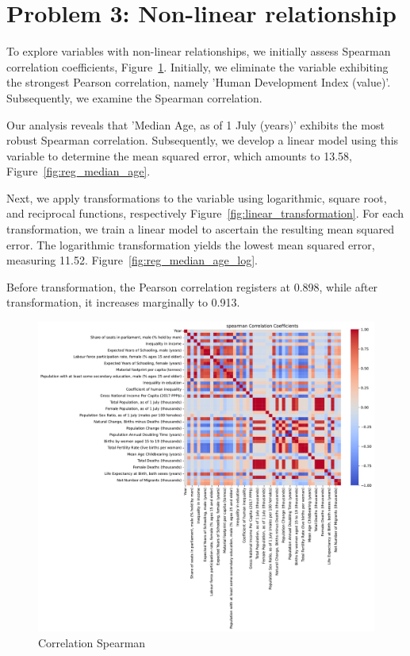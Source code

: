 \documentclass[a4paper]{article}
\begin{document}
\section*{Problem 3: Non-linear relationship}

To explore variables with non-linear relationships, we initially assess Spearman correlation coefficients, Figure~\ref{fig:spearman_correlation}. 
Initially, we eliminate the variable exhibiting the strongest Pearson correlation, namely 'Human Development Index (value)'. Subsequently, we examine the Spearman correlation.

Our analysis reveals that 'Median Age, as of 1 July (years)' exhibits the most robust Spearman correlation. Subsequently, 
we develop a linear model using this variable to determine the mean squared error, which amounts to 13.58, Figure~\ref{fig:reg_median_age}.

Next, we apply transformations to the variable using logarithmic, square root, and reciprocal functions, respectively  Figure~\ref{fig:linear_transformation}. 
For each transformation, we train a linear model to ascertain the resulting mean squared error. The logarithmic transformation yields the lowest mean squared error, measuring 11.52.  Figure~\ref{fig:reg_median_age_log}.

Before transformation, the Pearson correlation registers at 0.898, while after transformation, it increases marginally to 0.913.


\begin{figure}[H]
  \begin{center}
    \includegraphics[width=\textwidth]{ola/spearman_correlation.pdf}
    \caption{Correlation Spearman}
    \label{fig:spearman_correlation}
  \end{center}
\end{figure}
\end{document}
